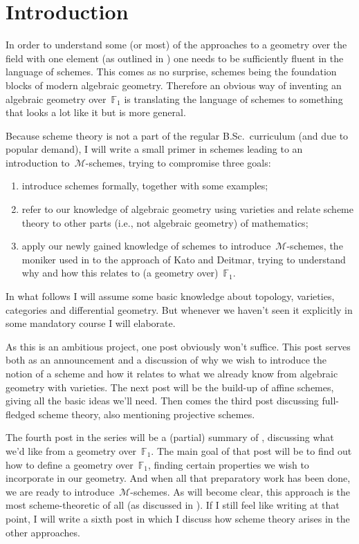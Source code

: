 \section*{Introduction}

In order to understand some (or most) of the approaches to a geometry over the field with one element (as outlined in \cite{mapping-fun}) one needs to be sufficiently fluent in the language of schemes. This comes as no surprise, schemes being the foundation blocks of modern algebraic geometry. Therefore an obvious way of inventing an algebraic geometry over~$\mathbb{F}_1$ is translating the language of schemes to something that looks a lot like it but is more general.

Because scheme theory is not a part of the regular B.Sc.\ curriculum (and due to popular demand), I will write a small primer in schemes leading to an introduction to~$\mathcal{M}$-schemes, trying to compromise three goals:
\begin{enumerate}
  \item introduce schemes formally, together with some examples;
  \item refer to our knowledge of algebraic geometry using varieties and relate scheme theory to other parts (i.e., not algebraic geometry) of mathematics;
  \item apply our newly gained knowledge of schemes to introduce~$\mathcal{M}$-schemes, the moniker used in \cite{mapping-fun} to the approach of Kato and Deitmar, trying to understand why and how this relates to (a geometry over)~$\mathbb{F}_1$.
\end{enumerate}

In what follows I will assume some basic knowledge about topology, varieties, categories and differential geometry. But whenever we haven't seen it explicitly in some mandatory course I will elaborate.

As this is an ambitious project, one post obviously won't suffice. This post serves both as an announcement and a discussion of why we wish to introduce the notion of a scheme and how it relates to what we already know from algebraic geometry with varieties. The next post will be the build-up of affine schemes, giving all the basic ideas we'll need. Then comes the third post discussing full-fledged scheme theory, also mentioning projective schemes.

The fourth post in the series will be a (partial) summary of \cite{kapranov-smirnov}, discussing what we'd like from a geometry over~$\mathbb{F}_1$. The main goal of that post will be to find out how to define a geometry over~$\mathbb{F}_1$, finding certain properties we wish to incorporate in our geometry. And when all that preparatory work has been done, we are ready to introduce~$\mathcal{M}$-schemes. As will become clear, this approach is the most scheme-theoretic of all (as discussed in \cite{mapping-fun}). If I still feel like writing at that point, I will write a sixth post in which I discuss how scheme theory arises in the other approaches.
